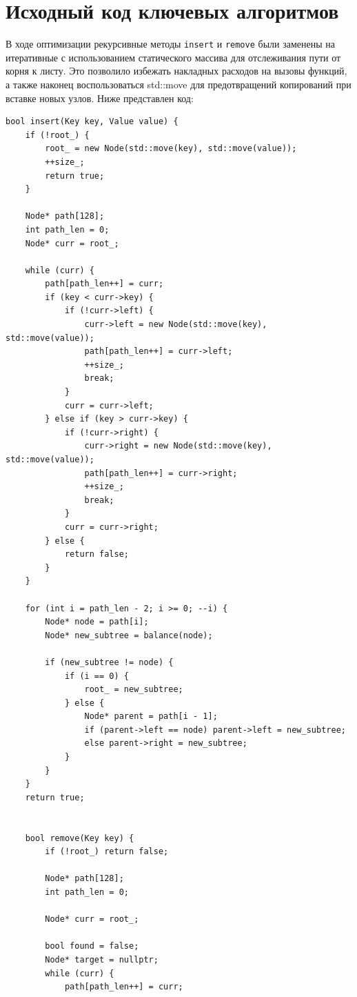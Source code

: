 \section{Исходный код ключевых алгоритмов}
В ходе оптимизации рекурсивные методы \texttt{insert} и \texttt{remove} были заменены на итеративные с использованием статического массива для отслеживания пути от корня к листу. Это позволило избежать накладных расходов на вызовы функций, а также наконец воспользоваться std::move для предотвращений копирований при вставке новых узлов. Ниже представлен код:

\begin{lstlisting}
bool insert(Key key, Value value) {
    if (!root_) {
        root_ = new Node(std::move(key), std::move(value));
        ++size_;
        return true;
    }

    Node* path[128];
    int path_len = 0;
    Node* curr = root_;

    while (curr) {
        path[path_len++] = curr;
        if (key < curr->key) {
            if (!curr->left) {
                curr->left = new Node(std::move(key), std::move(value));
                path[path_len++] = curr->left;
                ++size_;
                break;
            }
            curr = curr->left;
        } else if (key > curr->key) {
            if (!curr->right) {
                curr->right = new Node(std::move(key), std::move(value));
                path[path_len++] = curr->right;
                ++size_;
                break;
            }
            curr = curr->right;
        } else {
            return false;
        }
    }

    for (int i = path_len - 2; i >= 0; --i) {
        Node* node = path[i];
        Node* new_subtree = balance(node);

        if (new_subtree != node) {
            if (i == 0) {
                root_ = new_subtree;
            } else {
                Node* parent = path[i - 1];
                if (parent->left == node) parent->left = new_subtree;
                else parent->right = new_subtree;
            }
        }
    }
    return true;


    bool remove(Key key) {
        if (!root_) return false;

        Node* path[128];
        int path_len = 0;

        Node* curr = root_;

        bool found = false;
        Node* target = nullptr;
        while (curr) {
            path[path_len++] = curr;


\end{lstlisting}
